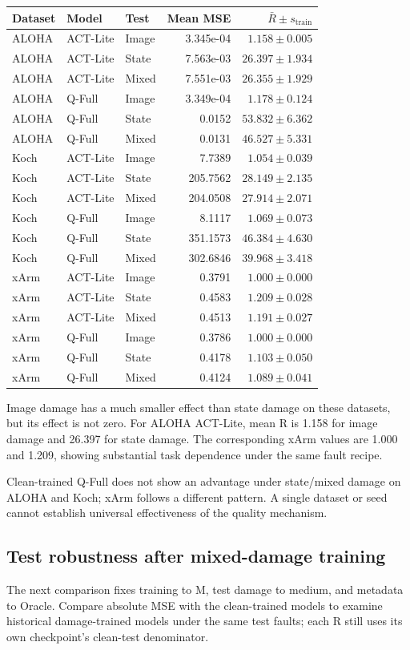 \documentclass[11pt,a4paper]{article}
\newcommand{\note}[1]{\begin{tcolorbox}[colback=panel,colframe=rule,boxrule=0.5pt,arc=1mm]#1\end{tcolorbox}}
\begin{document}
\begin{center}
\footnotesize
\begin{tabular}{lllrr}
\toprule
Dataset & Model & Test & Mean MSE & $\bar R\pm s_{\mathrm{train}}$ \\
\midrule
ALOHA & ACT-Lite & Image & 3.345e-04 & $1.158\pm0.005$ \\
ALOHA & ACT-Lite & State & 7.563e-03 & $26.397\pm1.934$ \\
ALOHA & ACT-Lite & Mixed & 7.551e-03 & $26.355\pm1.929$ \\
ALOHA & Q-Full & Image & 3.349e-04 & $1.178\pm0.124$ \\
ALOHA & Q-Full & State & 0.0152 & $53.832\pm6.362$ \\
ALOHA & Q-Full & Mixed & 0.0131 & $46.527\pm5.331$ \\
Koch & ACT-Lite & Image & 7.7389 & $1.054\pm0.039$ \\
Koch & ACT-Lite & State & 205.7562 & $28.149\pm2.135$ \\
Koch & ACT-Lite & Mixed & 204.0508 & $27.914\pm2.071$ \\
Koch & Q-Full & Image & 8.1117 & $1.069\pm0.073$ \\
Koch & Q-Full & State & 351.1573 & $46.384\pm4.630$ \\
Koch & Q-Full & Mixed & 302.6846 & $39.968\pm3.418$ \\
xArm & ACT-Lite & Image & 0.3791 & $1.000\pm0.000$ \\
xArm & ACT-Lite & State & 0.4583 & $1.209\pm0.028$ \\
xArm & ACT-Lite & Mixed & 0.4513 & $1.191\pm0.027$ \\
xArm & Q-Full & Image & 0.3786 & $1.000\pm0.000$ \\
xArm & Q-Full & State & 0.4178 & $1.103\pm0.050$ \\
xArm & Q-Full & Mixed & 0.4124 & $1.089\pm0.041$ \\
\bottomrule
\end{tabular}
\end{center}
Image damage has a much smaller effect than state damage on these datasets, but its effect is not zero. For ALOHA ACT-Lite, mean R is 1.158 for image damage and 26.397 for state damage. The corresponding xArm values are 1.000 and 1.209, showing substantial task dependence under the same fault recipe.

\note{Clean-trained Q-Full does not show an advantage under state/mixed damage on ALOHA and Koch; xArm follows a different pattern. A single dataset or seed cannot establish universal effectiveness of the quality mechanism.}
\clearpage\subsection{Test robustness after mixed-damage training}
The next comparison fixes training to M, test damage to medium, and metadata to Oracle. Compare absolute MSE with the clean-trained models to examine historical damage-trained models under the same test faults; each R still uses its own checkpoint's clean-test denominator.
\end{document}
